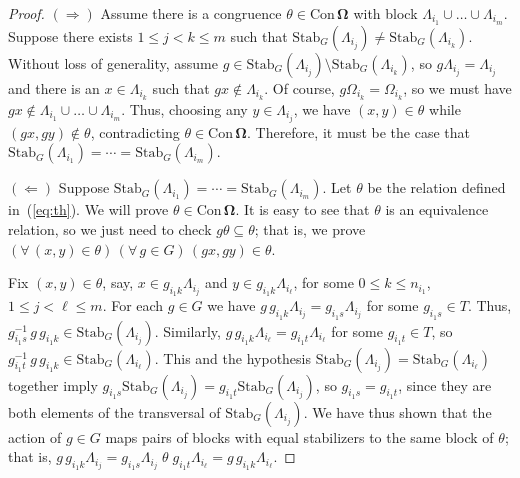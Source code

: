 \documentclass[cm,dissertation,actual,final]{uhthesis}
\theoremstyle{plain}
\theoremstyle{definition}
\theoremstyle{remark}
\numberwithin{theorem}{section}
\numberwithin{claim}{chapter}
\numberwithin{equation}{section}
\numberwithin{conjecture}{chapter}
\newcommand{\<}{\ensuremath{\langle}}
\renewcommand{\>}{\ensuremath{\rangle}}
\renewcommand{\leq}{\ensuremath{\leqslant}}
\newcommand{\Stab}{\ensuremath{\mathrm{Stab}}}
\newcommand{\Con}{\ensuremath{\mathrm{Con\,}}}
\newcommand{\0}{\ensuremath{\mathbf{0}}}
\newcommand{\1}{\ensuremath{\mathbf{1}}}
\newcommand{\2}{\ensuremath{\mathbf{2}}}
\newcommand{\3}{\ensuremath{\mathbf{3}}}
\newcommand{\4}{\ensuremath{\mathbf{4}}}
\newcommand{\5}{\ensuremath{\mathbf{5}}}
\newcommand{\bOmega}{\ensuremath{\alg \Omega}}
\newcommand{\ConO}{\ensuremath{\Con \bOmega}}
\newcommand{\alg}[1]{\mathbf{#1}}
\begin{document}
\begin{proof}
$(\Rightarrow)$  Assume there is a congruence $\theta \in \ConO$ with block 
$\Lambda_{i_1} \cup \dots  \cup \Lambda_{i_m}$.  
Suppose there exists $1\leq j < k \leq m$ such that 
$\Stab_G(\Lambda_{i_j}) \neq \Stab_G(\Lambda_{i_k})$.  Without loss of generality, assume 
$g\in \Stab_G(\Lambda_{i_j}) \setminus \Stab_G(\Lambda_{i_k})$, so $g \Lambda_{i_j} = \Lambda_{i_j}$ and
there is an $x\in \Lambda_{i_k}$ such that $g x \notin \Lambda_{i_k}$.  Of course, 
$g \Omega_{i_k} = \Omega_{i_k}$, so we must have
$g x \notin \Lambda_{i_1} \cup \dots  \cup \Lambda_{i_m}$.  Thus, choosing any $y\in
\Lambda_{i_j}$, we have $(x,y)\in \theta$ while 
$(g x, g y)\notin \theta$, contradicting $\theta \in \ConO$.  Therefore, it must be
the case that 
$\Stab_G(\Lambda_{i_1}) = \cdots = \Stab_G(\Lambda_{i_m})$.

\medskip

\noindent $(\Leftarrow)$  
Suppose $\Stab_G(\Lambda_{i_1}) = \cdots = \Stab_G(\Lambda_{i_m})$.
Let $\theta$ be the relation defined in~(\ref{eq:th}).  We will prove $\theta \in
\ConO$.  It is easy to see that $\theta$ is an equivalence relation, so we
just need to check $g \theta \subseteq \theta$; that is, we prove
$(\forall \, (x,y)\in \theta)\, (\forall \, g\in G) \,
(gx ,gy)\in \theta$.

Fix $(x,y)\in \theta$, say, 
$x\in g_{i_1 k}\Lambda_{i_j}$ and 
$y\in g_{i_1 k}\Lambda_{i_\ell}$, 
for some $0 \leq k \leq n_{i_1}$,
$1\leq j < \ell \leq m$.  
For each $g\in G$ we have 
$g\, g_{i_1 k}\Lambda_{i_j} = g_{i_1 s}\Lambda_{i_j}$
for some $g_{i_1 s}\in T$.
Thus, $g_{i_1 s}^{-1} \, g\, g_{i_1 k} \in \Stab_G(\Lambda_{i_j})$.
Similarly, $g\, g_{i_1 k}\Lambda_{i_\ell} = g_{i_1 t}\Lambda_{i_\ell}$
for some $g_{i_1 t}\in T$, so
$g_{i_1 t}^{-1}\, g \, g_{i_1 k} \in
\Stab_G(\Lambda_{i_\ell})$.
This and the hypothesis $\Stab_G(\Lambda_{i_j}) = \Stab_G(\Lambda_{i_\ell})$ together imply
$g_{i_1 s}\Stab_G(\Lambda_{i_j}) = g_{i_1 t}\Stab_G(\Lambda_{i_j})$, 
so $g_{i_1 s} = g_{i_1 t}$, since they are both elements of the transversal of
$\Stab_G(\Lambda_{i_j})$.   We have thus shown that the action of $g\in G$ 
maps pairs of blocks with equal stabilizers to the same block of $\theta$; that is, 
$g \, g_{i_1 k}\Lambda_{i_j} = g_{i_1 s}\Lambda_{i_j}  \; \theta \;
g_{i_1 t} \Lambda_{i_\ell} = g \, g_{i_1 k}\Lambda_{i_\ell}$.
\end{proof}

\end{document}
